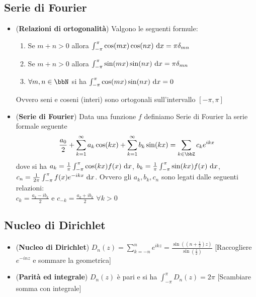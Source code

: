 \documentclass[a4paper,NoNotes,GeneralMath]{stdmdoc}
\newcommand{\intpie}{\int_{-\pi}^\pi }
\newcommand{\fracpie}{\frac{1}{\pi}}
\newcommand{\fractopie}{\frac{1}{2\pi}}
\begin{document}
	\subsection*{Serie di Fourier}
	\begin{itemize}
		\item ({\bf Relazioni di ortogonalità}) Valgono le seguenti formule:
			\begin{enumerate}
				\item Se $m + n > 0$ allora $\intpie \cos(mx) \cos(nx) \de{x} = \pi \delta_{mn}$
				\item Se $m + n > 0$ allora $\intpie \sin(mx) \sin(nx) \de{x} = \pi \delta_{mn}$
				\item $\forall m, n \in \bbN$ si ha $\intpie \cos(mx) \sin(nx) \de{x} = 0$
			\end{enumerate}
			Ovvero seni e coseni (interi) sono ortogonali sull'intervallo $[-\pi, \pi]$
		\item ({\bf Serie di Fourier}) Data una funzione $f$ definiamo Serie di Fourier la serie formale seguente
			$$ \frac{a_0}{2} + \sum_{k = 1}^\infty a_k \cos(kx) + \sum_{k = 1}^\infty b_k \sin(kx) = \sum_{k \in \bbZ} c_k e^{ikx} $$
			dove si ha $a_k = \fracpie \intpie \cos(kx) f(x) \de{x}$, $b_k = \fracpie \intpie \sin(kx) f(x) \de{x}$, $c_n = \fractopie \intpie f(x) e^{-ikx} \de{x}$. Ovvero gli $a_k, b_k, c_n$ sono legati dalle seguenti relazioni: \\
			$c_k = \frac{a_k - i b_k}{2}$ e $c_{-k} = \frac{a_k + i b_k}{2}$ $\forall k > 0$
	\end{itemize}
	
	\subsection*{Nucleo di Dirichlet}
	\begin{itemize}
		\item ({\bf Nucleo di Dirichlet}) $D_n(z) = \sum_{k = -n}^n e^{ikz} = \frac{\sin((n + \frac{1}{2}) z)}{\sin(\frac{z}{2})}$ [Raccogliere $e^{-inz}$ e sommare la geometrica]
		\item ({\bf Parità ed integrale}) $D_n(z)$ è pari e si ha $\int_{-\pi}^\pi D_n(z) = 2 \pi$ [Scambiare somma con integrale]		
	\end{itemize}
	
\end{document}
